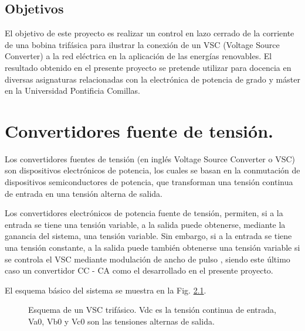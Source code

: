 \documentclass{report}
\begin{document}
\section{Objetivos}\label{sec.objetivos}

El objetivo de este proyecto es realizar un control en lazo cerrado de la corriente de una bobina trifásica para ilustrar la conexión de un VSC (Voltage Source Converter) a la red eléctrica en la aplicación de las energías renovables. 
El resultado obtenido en el presente proyecto se pretende utilizar para docencia en diversas asignaturas relacionadas con la electrónica de potencia de grado y máster en la Universidad Pontificia Comillas.

\chapter{Convertidores fuente de tensión.} \label{sec.convertidoresfuentedetension}

Los convertidores fuentes de tensión (en inglés Voltage Source Converter o VSC) son dispositivos electrónicos de potencia, los cuales se basan en la conmutación de dispositivos semiconductores de potencia, que transforman una tensión continua de entrada en una tensión alterna de salida.

Los convertidores electrónicos de potencia fuente de tensión, permiten, si a la entrada se tiene una tensión variable, a la salida puede obtenerse, mediante la ganancia del sistema, una tensión variable. Sin embargo, si a la entrada se tiene una tensión constante, a la salida puede también obtenerse una tensión variable si se controla el VSC mediante modulación de ancho de pulso \cite{dieciocho}, siendo este último caso un convertidor CC - CA como el desarrollado en el presente proyecto.

El esquema básico del sistema se muestra en la Fig. \ref{fig.inversortrifasicoesquematico}.

\begin{figure}[!h]
    \begin{center}
    \end{center}
    \caption{Esquema de un VSC trifásico. Vdc es la tensión continua de entrada, Va0, Vb0 y Vc0 son las tensiones alternas de salida.}
    \label{fig.inversortrifasicoesquematico}
    \end{figure}
\end{document}
